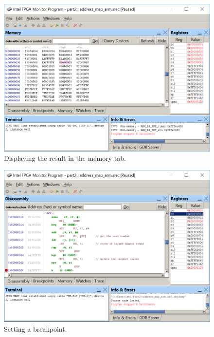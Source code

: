 \documentclass[epsfig,10pt,fullpage]{article}
\begin{document}
\begin{enumerate}
\begin{figure}[H]
	\begin{center}
	\includegraphics[scale=0.8]{figures/figureMP_mem.png}
	\end{center}
	\vspace{-0.5cm}\caption{Displaying the result in the memory tab.}
\label{fig:MP_mem}
\end{figure} 

\begin{figure}[H]
	\begin{center}
	\includegraphics[scale=0.8]{figures/figureMP13.png}
	\end{center}
	\vspace{-0.5cm}\caption{Setting a breakpoint.}
\label{fig:MP13}
\end{figure} 

\end{enumerate}
\end{document}
